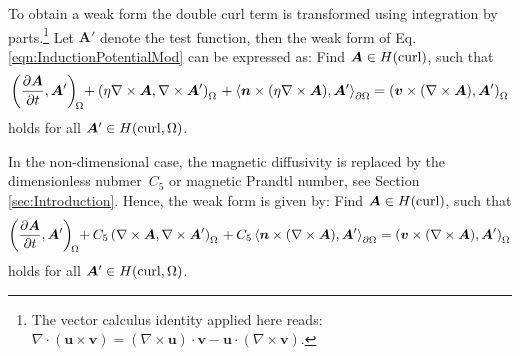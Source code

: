 To obtain a weak form the double curl term is transformed using integration by parts.\footnote{The vector calculus identity applied here reads: $\nabla\cdot(\bm{u}\times\bm{v})=(\nabla\times\bm{u})\cdot\bm{v}-\bm{u}\cdot(\nabla\times\bm{v})$.} Let $\bm{A}'$ denote the test function, then the weak form of Eq.\,\eqref{eqn:InductionPotentialMod} can be expressed as: Find $\bm{A}\in H(\operatorname{curl})$, such  that
\begin{equation}
	\left(\pd{\bm{A}}{t},\bm{A}'\right)_{\!\mathrlap{\Omega}\ }
	+\left(\eta\nabla\times\bm{A},\nabla\times\bm{A}'\right)_{\mathrlap{\Omega}\ \ }+\left\langle\bm{n}\times(\eta\nabla\times\bm{A}),\bm{A}'\right\rangle_{\p\Omega}=\left(\bm{v}\times(\nabla\times\bm{A}),\bm{A}'\right)_{\Omega}
\end{equation}
holds for all $\bm{A}'\in H(\operatorname{curl}, \Omega)$.

In the non-dimensional case, the magnetic diffusivity is replaced by the dimensionless nubmer~$C_5$ or magnetic Prandtl number, see Section\,\ref{sec:Introduction}. Hence, the weak form is given by: Find $\bm{A}\in H(\operatorname{curl})$, such  that
\begin{equation}
	\label{eqn:WeakFormA}
	\left(\pd{\bm{A}}{t},\bm{A}'\right)_{\!\mathrlap{\Omega}\ }
	+C_5\left(\nabla\times\bm{A},\nabla\times\bm{A}'\right)_{\mathrlap{\Omega}\ \ }
	+C_5\left\langle\bm{n}\times(\nabla\times\bm{A}),\bm{A}'\right\rangle_{\p\Omega}=\left(\bm{v}\times(\nabla\times\bm{A}),\bm{A}'\right)_{\Omega}
\end{equation}
holds for all $\bm{A}'\in H(\operatorname{curl}, \Omega)$.

